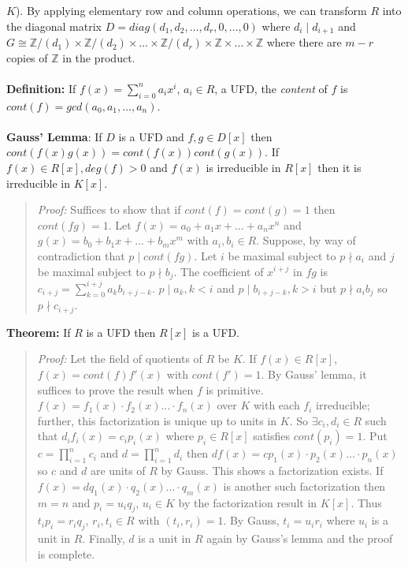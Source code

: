 $K$).  By applying elementary row and column operations, we can transform $R$ into
the diagonal matrix $D= diag(d_1 , d_2 , \ldots , d_r , 0, \ldots , 0)$ where
$d_i \mid d_{i+1}$
and $G \cong {\mathbb Z}/(d_1) \times {\mathbb Z}/(d_2) \times \ldots 
\times {\mathbb Z}/(d_r) \times {\mathbb Z} \times \ldots \times {\mathbb Z}$ where there
are $m-r$ copies of ${\mathbb Z}$ in the product.
\\
\\
{\bf Definition:} If $f(x)= \sum_{i=0}^n a_i x^i$, $a_i \in R$, a UFD, the \emph{content} of
$f$ is $cont(f)= gcd(a_0, a_1, \ldots, a_n)$.  
\\
\\
{\bf Gauss' Lemma}: 
If $D$ is a UFD and $f, g \in D[x]$ then
$cont(f(x)g(x))= cont(f(x)) cont(g(x))$.  If $f(x) \in R[x], deg(f)>0$ and $f(x)$
is irreducible in $R[x]$ then it is irreducible in $K[x]$.
\begin{quote}
\emph{Proof:}
Suffices to show that if $cont(f)=cont(g)=1$ then $cont(fg)=1$.  Let
$f(x)= a_0 + a_1 x + \ldots +a_n x^n$ and
$g(x)= b_0 + b_1 x + \ldots +b_m x^m$ with $a_i, b_i \in R$.  Suppose, by way of
contradiction that $p \mid cont(fg)$.  Let 
$i$ be maximal subject to $p \nmid a_i$ and
$j$ be maximal subject to $p \nmid b_j$.  The coefficient of $x^{i+j}$ in $fg$ is
$c_{i+j}= \sum_{k=0}^{i+j} a_k b_{i+j-k}$.  
$p \mid a_k, k<i$ and
$p \mid b_{i+j-k}, k>i$ but $p \nmid a_i b_j$ so $p \nmid c_{i+j}$.
\end{quote}
{\bf Theorem:} If $R$ is a UFD then
$R[x]$ is a UFD. 
\begin{quote}
\emph{Proof:}
Let the field of quotients of $R$ be $K$.  If $f(x) \in R[x]$, $f(x)= cont(f) f'(x)$
with $cont(f')=1$.  By Gauss' lemma, it suffices to prove the result
when $f$ is primitive.
$f(x)= f_1(x) \cdot f_2(x) \ldots \cdot f_n(x)$ over $K$ with each $f_i$ irreducible;
further, this factorization is unique up to units in $K$.  So $\exists c_i, d_i \in R$ 
such that 
$d_i f_i(x)= c_i p_i(x)$ where $p_i \in R[x]$ satisfies $cont(p_i)=1$.
Put $c= \prod_{i=1}^n c_i$ and
$d= \prod_{i=1}^n d_i$  then $d f(x)=
c p_1(x) \cdot p_2(x) \ldots \cdot p_n(x)$ so $c$ and $d$ are units of $R$ by Gauss.
This shows a factorization exists.
If $f(x)= d q_1(x) \cdot q_2(x) \ldots \cdot q_m(x)$
is another such factorization then $m=n$  
and $p_i= u_i q_j$, $u_i \in K$ by the factorization result in $K[x]$.  Thus
$t_i p_i= r_i q_j$, $r_i, t_i \in R$ with $(t_i, r_i)= 1$.  By Gauss, $t_i= u_i r_i$
where $u_i$ is a unit in $R$.
Finally, 
$d$ is a unit in $R$ again by Gauss's lemma and the proof is complete.
\end{quote}
